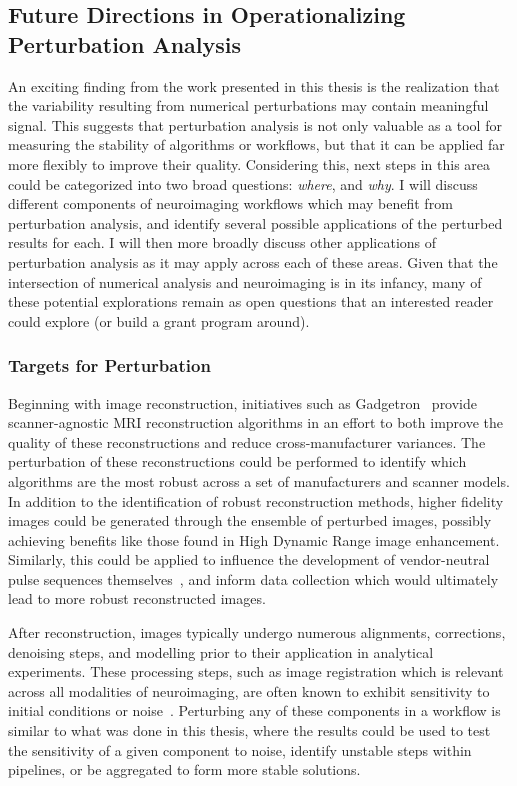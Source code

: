 \subsection{Future Directions in Operationalizing Perturbation Analysis}
An exciting finding from the work presented in this thesis is the realization that the variability resulting
from numerical perturbations may contain meaningful signal. This suggests that perturbation analysis is not only
valuable as a tool for measuring the stability of algorithms or workflows, but that it can be applied far more
flexibly to improve their quality. Considering this, next steps in this area could be categorized into two
broad questions: \textit{where}, and \textit{why}. I will discuss different components of neuroimaging workflows
which may benefit from perturbation analysis, and identify several possible applications of the perturbed
results for each. I will then more broadly discuss other applications of perturbation analysis as it may apply
across each of these areas. Given that the intersection of numerical analysis and neuroimaging is in its
infancy, many of these potential explorations remain as open questions that an interested reader could explore
(or build a grant program around).

\subsubsection{Targets for Perturbation}

Beginning with image reconstruction, initiatives such as Gadgetron~\cite{hansen2013gadgetron} provide
scanner-agnostic MRI reconstruction algorithms in an effort to both improve the quality of these reconstructions
and reduce cross-manufacturer variances. The perturbation of these reconstructions could be performed to
identify which algorithms are the most robust across a set of manufacturers and scanner models. In addition to
the identification of robust reconstruction methods, higher fidelity images could be generated through the
ensemble of perturbed images, possibly achieving benefits like those found in High Dynamic Range image
enhancement. Similarly, this could be applied to influence the development of vendor-neutral pulse sequences
themselves~\cite{karakuzu2020qmrlab}, and inform data collection which would ultimately lead to more robust
reconstructed images.

After reconstruction, images typically undergo numerous alignments, corrections, denoising steps, and
modelling prior to their application in analytical experiments. These processing steps, such as image
registration which is relevant across all modalities of neuroimaging, are often known to exhibit sensitivity
to initial conditions or noise~\cite{salari2020file}. Perturbing any of these components in a workflow is
similar to what was done in this thesis, where the results could be used to test the sensitivity of a given
component to noise, identify unstable steps within pipelines, or be aggregated to form more stable solutions.

